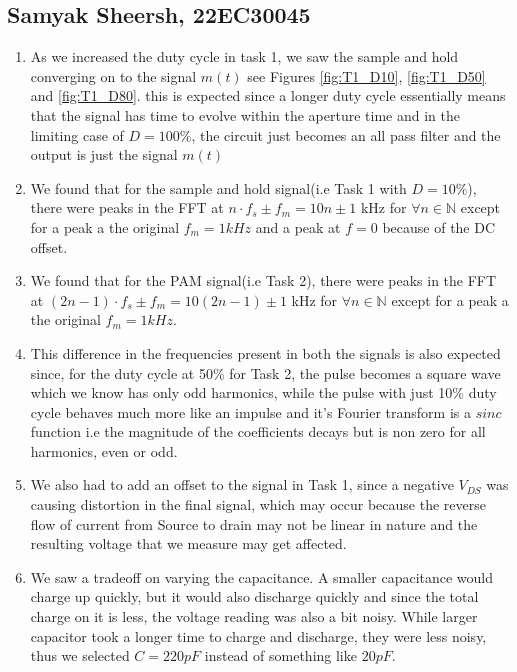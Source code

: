 \documentclass{article}
\begin{document}
\subsection{Samyak Sheersh, 22EC30045}
\begin{enumerate}
  \item As we increased the duty cycle in task 1,  we saw the sample and hold converging on to the signal $m(t)$ see Figures \ref{fig:T1_D10}, \ref{fig:T1_D50} and \ref{fig:T1_D80}. this is expected since a longer duty cycle essentially means that the signal has time to evolve within the aperture time and in the limiting case of $D=100\%$, the circuit just becomes an all pass filter and the output is just the signal $m(t)$
  \item  We found that for the sample and hold signal(i.e Task 1 with $D=10\%$), there were peaks in the FFT at $n\cdot f_s\pm f_m=10n\pm 1$ kHz for $\forall n \in \mathbb{N}$ except for a peak a the original $f_m=1kHz$ and a peak at $f=0$ because of the DC offset.  
  \item We found that for the PAM signal(i.e Task 2), there were peaks in the FFT at $(2n-1)\cdot f_s\pm f_m=10(2n-1)\pm 1$ kHz for $\forall n \in \mathbb{N}$ except for a peak a the original $f_m=1kHz$.  
  \item This difference in the frequencies present in both the signals is also expected since, for the duty cycle at 50\% for Task 2, the pulse becomes a square wave which we know has only odd harmonics, while the pulse with just 10\% duty cycle behaves much more like an impulse and it's Fourier transform is a $sinc$ function i.e the magnitude of the coefficients decays but is non zero for all harmonics, even or odd. 
  \item We also had to add an offset to the signal in Task 1, since a negative $V_{DS}$ was causing distortion in the final signal, which may occur because the reverse flow of current from Source to drain may not be linear in nature and the resulting voltage that we measure may get affected. 
  \item We saw a tradeoff on varying the capacitance. A smaller capacitance would charge up quickly, but it would also discharge quickly and since the total charge on it is less, the voltage reading was also a bit noisy. While larger capacitor took a longer time to charge and discharge, they were less noisy, thus we selected $C=220 pF$ instead of something like $20pF$.
\end{enumerate}
\end{document}
